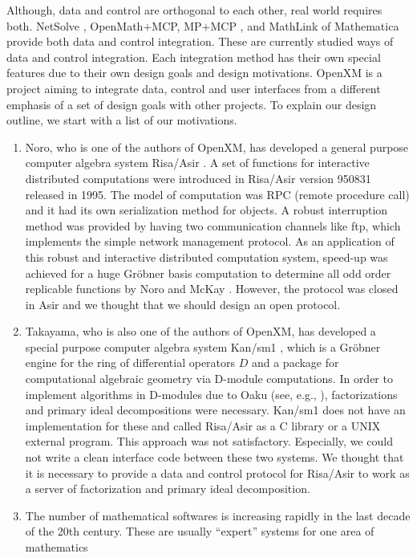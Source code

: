Although, data and control are orthogonal to each other,
real world requires both.
NetSolve \cite{netsolve}, OpenMath$+$MCP, MP$+$MCP \cite{iamc},
and MathLink of Mathematica provide both data and control integration.
These are currently studied ways of data and control integration.
Each integration method has their own special features due to their
own design goals and design motivations.
OpenXM is a project aiming to integrate data, control and user interfaces
from a different emphasis of a set of design goals with other projects.
To explain our design outline, we start with a list of
our motivations.
\begin{enumerate}
\item Noro,  who is one of the authors of OpenXM, has developed a general
purpose computer algebra system Risa/Asir \cite{asir}.
A set of functions for interactive distributed computations were introduced
in Risa/Asir version 950831 released in 1995.
The model of computation was RPC (remote procedure call)
and it had its own serialization method for objects.
A robust interruption method was provided by having two communication channels
like ftp, which implements the simple network management protocol.
As an application of this robust and interactive distributed computation
system, speed-up was achieved for a huge Gr\"obner basis computation
to determine all odd order replicable functions 
by Noro and McKay \cite{noro-mckay}.
However, the protocol was closed in Asir and we thought that we should
design an open protocol.
\item Takayama, who is also one of the authors of OpenXM, has developed
a special purpose computer algebra system Kan/sm1 \cite{kan},
which is a Gr\"obner engine for the ring of differential operators $D$ and
a package for computational algebraic geometry via D-module computations.
In order to implement algorithms in D-modules due to Oaku 
(see, e.g., \cite{sst-book}),
factorizations and primary ideal decompositions were necessary.
Kan/sm1 does not have an implementation for these and called
Risa/Asir as a C library or a UNIX external program.
This approach was not satisfactory.
Especially, we could not write a clean interface code between these
two systems.
We thought that it is necessary to provide a data and control protocol
for Risa/Asir to work as a server of factorization and primary ideal
decomposition.
\item The number of mathematical softwares is increasing rapidly in the last
decade of the 20th century.
These are usually ``expert'' systems for one area of mathematics

\end{enumerate}
